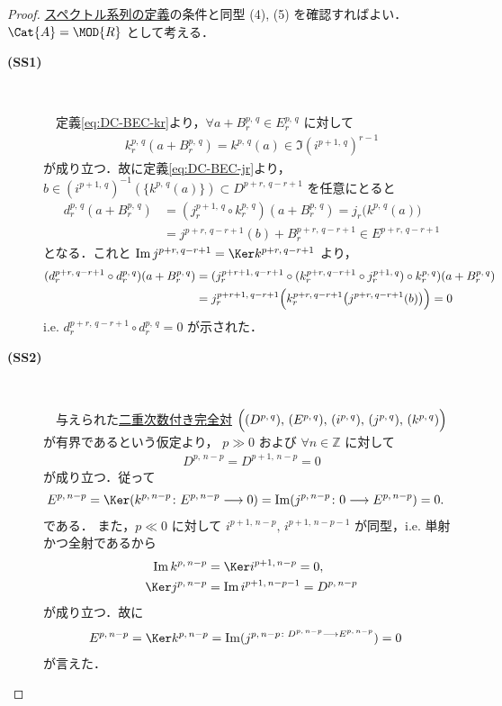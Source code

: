 \documentclass[algtopo_main]{subfiles}
\begin{document}
\begin{proof}
    \hyperref[def:SSQ]{スペクトル系列の定義}の条件と同型 (4), (5) を確認すればよい．$\Cat{A} = \MOD{R}$ として考える．
    \begin{description}
        \item[\textbf{(SS1)}] 　
        
        　定義\eqref{eq:DC-BEC-kr}より，$\forall a + B_r^{p,\, q} \in E_r^{p,\, q}$ に対して
        \begin{align}
            k_r^{p,\, q} (a + B_r^{p,\, q}) = k^{p,\, q}(a) \in \Im (i^{p+1,\, q})^{r-1}
        \end{align}
        が成り立つ．故に定義\eqref{eq:DC-BEC-jr}より，$b \in (i^{p+1,\, q})^{-1} (\{k^{p,\, q}(a)\}) \subset D^{p+r,\, q-r+1}$ を任意にとると
        \begin{align}
            d_r^{p,\, q} (a + B_r^{p,\, q}) &= (j^{p+1,\, q}_r \circ k^{p,\, q}_r)(a + B_r^{p,\, q}) = j_r \bigl(  k^{p,\, q}(a)  \bigr) \\
            &= j^{p+r,\, q-r+1}(b) + B_r^{p+r,\, q-r+1} \in E^{p+r,\, q-r+1}
        \end{align}
        となる．これと $\Im j^{p+r,\, q-r+1} = \Ker k^{p+r,\, q-r+1}$ より，
        \begin{align}
            (d_r^{p+r,\, q-r+1} \circ d_r^{p,\, q})(a + B_r^{p,\, q}) &= (j_r^{p+r+1,\, q-r+1} \circ (k_r^{p+r,\, q-r+1} \circ j_r^{p+1,\, q}) \circ k_r^{p,\, q})(a + B_r^{p,\, q}) \\
            &= j_r^{p+r+1,\, q-r+1} \Bigl( k_r^{p+r,\, q-r+1} \bigl( j^{p+r,\, q-r+1}(b) \bigr)  \Bigr) = 0
        \end{align}
        i.e. $d_r^{p+r,\, q-r+1} \circ d_r^{p,\, q} = 0$ が示された．
        \item[\textbf{(SS2)}] 　
        
        　与えられた\hyperref[def:BEC]{二重次数付き完全対} $\Bigl( (D^{p,\, q}),\, (E^{p,\, q}),\, (i^{p,\, q}),\, (j^{p,\, q}),\, (k^{p,\, q}) \Bigr)$ が有界であるという仮定より，
        $p \gg 0$ および $\forall n \in \mathbb{Z}$ に対して
        \begin{align}
            D^{p,\, n-p} = D^{p+1,\, n-p} =0
        \end{align}
        が成り立つ．従って
        \begin{align}
            E^{p,\, n-p} &= \Ker (k^{p,\, n-p} \colon E^{p,\, n-p} \lto 0) = \Im (j^{p,\, n-p} \colon 0 \lto E^{p,\, n-p}) = 0.
        \end{align}
        である．
        また，$p \ll 0$ に対して $i^{p+1,\, n-p},\, i^{p+1,\, n-p-1}$ が同型，i.e. 単射かつ全射であるから
        \begin{align}
            \Im k^{p,\, n-p} &= \Ker i^{p+1,\, n-p} = 0, \\
            \Ker j^{p,\, n-p} &= \Im i^{p+1,\, n-p-1} = D^{p,\, n-p}
        \end{align}
        が成り立つ．故に
        \begin{align}
            E^{p,\, n-p} &= \Ker k^{p,\, n-p} = \Im (j^{p,\, n-p \colon D^{p,\, n-p} \lto E^{p,\, n-p}}) = 0
        \end{align}
        が言えた．


\end{description}
\end{proof}
\end{document}
